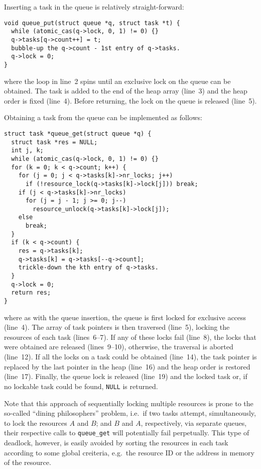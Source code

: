 \documentclass[preprint]{elsarticle}
\begin{document}
Inserting a task in the queue is relatively straight-forward:
\begin{center}\begin{minipage}{0.9\textwidth}
    \begin{lstlisting}
void queue_put(struct queue *q, struct task *t) {
  while (atomic_cas(q->lock, 0, 1) != 0) {}
  q->tasks[q->count++] = t;
  bubble-up the q->count - 1st entry of q->tasks.
  q->lock = 0;
}
    \end{lstlisting}
\end{minipage}\end{center}
\noindent where the loop in line~2 spins until an exclusive
lock on the queue can be obtained.
The task is added to the end of the heap array (line~3)
and the heap order is fixed (line~4).
Before returning, the lock on the queue is released (line~5).

Obtaining a task from the queue can be implemented as follows:
\begin{center}\begin{minipage}{0.9\textwidth}
    \begin{lstlisting}
struct task *queue_get(struct queue *q) {
  struct task *res = NULL;
  int j, k;
  while (atomic_cas(q->lock, 0, 1) != 0) {}
  for (k = 0; k < q->count; k++) {
    for (j = 0; j < q->tasks[k]->nr_locks; j++)
      if (!resource_lock(q->tasks[k]->lock[j])) break;
    if (j < q->tasks[k]->nr_locks)
      for (j = j - 1; j >= 0; j--)
        resource_unlock(q->tasks[k]->lock[j]);
    else
      break;
  }
  if (k < q->count) {
    res = q->tasks[k];
    q->tasks[k] = q->tasks[--q->count];
    trickle-down the kth entry of q->tasks.
  }
  q->lock = 0;
  return res;
}
    \end{lstlisting}
\end{minipage}\end{center}
\noindent where as with the queue insertion, the queue is first
locked for exclusive access (line~4).
The array of task pointers is then traversed (line~5),
locking the resources of each task (lines~6--7).
If any of these locks fail (line~8), the locks that were obtained
are released (lines~9--10), otherwise, the traversal is aborted
(line~12).
If all the locks on a task could be obtained (line~14), the
task pointer is replaced by the last pointer in the heap (line~16)
and the heap order is restored (line~17).
Finally, the queue lock is released (line~19) and the locked task
or, if no lockable task could be found, {\tt NULL} is returned.

Note that this approach of sequentially locking multiple resources
is prone to the so-called ``dining philosophers'' problem, i.e.~if
two tasks attempt, simultaneously, to lock the resources $A$ and $B$;
and $B$ and $A$, respectively, via separate queues, their respective calls
to {\tt queue\_get} will potentially fail perpetually.
This type of deadlock, however, is easily avoided by sorting the
resources in each task according to some global creiteria, e.g.~the
resource ID or the address in memory of the resource.
\end{document}
